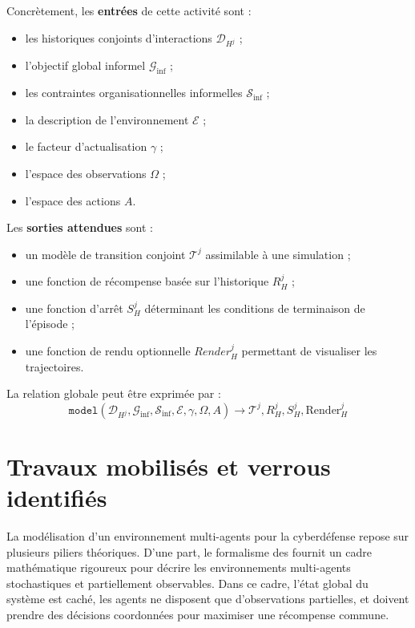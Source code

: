 Concrètement, les \textbf{entrées} de cette activité sont :
\begin{itemize}
    \item les historiques conjoints d’interactions $\mathcal{D}_{H^j}$ ;
    \item l’objectif global informel $\mathcal{G}_{\text{inf}}$ ;
    \item les contraintes organisationnelles informelles $\mathcal{S}_{\text{inf}}$ ;
    \item la description de l’environnement $\mathcal{E}$ ;
    \item le facteur d’actualisation $\gamma$ ;
    \item l’espace des observations $\Omega$ ;
    \item l’espace des actions $A$.
\end{itemize}

Les \textbf{sorties attendues} sont :
\begin{itemize}
    \item un modèle de transition conjoint $\mathcal{T}^j$ assimilable à une simulation ;
    \item une fonction de récompense basée sur l’historique $R^j_H$ ;
    \item une fonction d’arrêt $S^j_H$ déterminant les conditions de terminaison de l’épisode ;
    \item une fonction de rendu optionnelle $Render^j_H$ permettant de visualiser les trajectoires.
\end{itemize}

La relation globale peut être exprimée par :
\begin{displaymath}
    \texttt{model}(\mathcal{D}_{H^j}, \mathcal{G}_{\text{inf}}, \mathcal{S}_{\text{inf}}, \mathcal{E}, \gamma, \Omega, A) \rightarrow \mathcal{T}^j, R^j_H, S^j_H, \text{Render}^j_H
\end{displaymath}

\section{Travaux mobilisés et verrous identifiés}

La modélisation d’un environnement multi-agents pour la cyberdéfense repose sur plusieurs piliers théoriques.
D’une part, le formalisme des \textbf{} fournit un cadre mathématique rigoureux pour décrire les environnements multi-agents stochastiques et partiellement observables.
Dans ce cadre, l’état global du système est caché, les agents ne disposent que d’observations partielles, et doivent prendre des décisions coordonnées pour maximiser une récompense commune.

